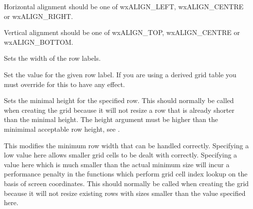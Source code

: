 Horizontal alignment should be one of wxALIGN\_LEFT, wxALIGN\_CENTRE or wxALIGN\_RIGHT.

Vertical alignment should be one of wxALIGN\_TOP, wxALIGN\_CENTRE or wxALIGN\_BOTTOM.



\label{wxgridsetrowlabelsize}


Sets the width of the row labels.



\label{wxgridsetrowlabelvalue}


Set the value for the given row label. If you are using a derived grid table you must
override 
for this to have any effect.



\label{wxgridsetrowminimalheight}


Sets the minimal height for the specified row. This should normally be called when creating the grid
because it will not resize a row that is already shorter than the minimal height.
The height argument must be higher than the minimimal acceptable row height, see
.



\label{wxgridsetrowminimalacceptableheight}


This modifies the minimum row width that can be handled correctly. Specifying a low value here
allows smaller grid cells to be dealt with correctly. Specifying a value here which is much smaller
than the actual minimum size will incur a performance penalty in the functions which perform
grid cell index lookup on the basis of screen coordinates.
This should normally be called when creating the grid because it will not resize existing rows
with sizes smaller than the value specified here.



